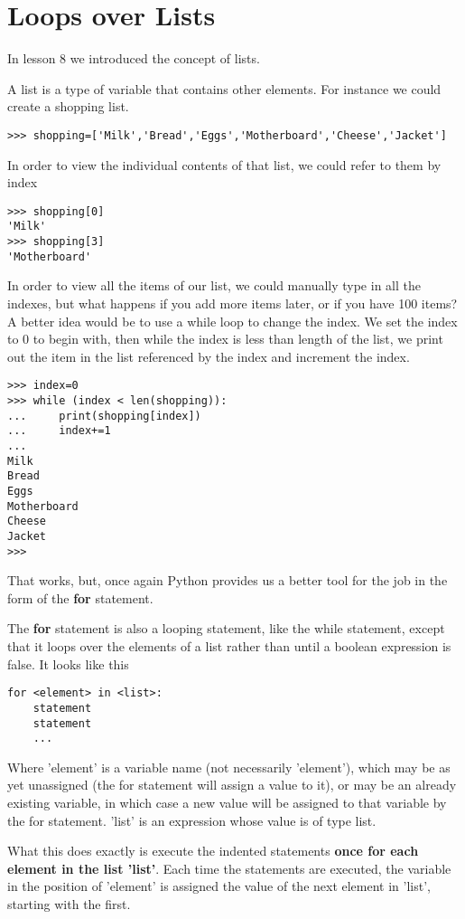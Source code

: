 \section{Loops over Lists}
In lesson 8 we introduced the concept of lists. 

A list is a type of variable that contains other elements. For instance we could create a shopping list. 
\begin{lstlisting}
>>> shopping=['Milk','Bread','Eggs','Motherboard','Cheese','Jacket']
\end{lstlisting}

In order to view the individual contents of that list, we could refer to them by index
\begin{lstlisting}
>>> shopping[0]
'Milk'
>>> shopping[3]
'Motherboard'
\end{lstlisting}

 In order to view all the items of our list, we could manually type in all the indexes, but what happens if you add more items later, or if you have 100 items? A better idea would be to use a while loop to change the index. We set the index to 0 to begin with, then while the index is less than length of the list, we print out the item in the list referenced by the index and increment the index.
\begin{lstlisting}
>>> index=0
>>> while (index < len(shopping)):
...     print(shopping[index])
...     index+=1
... 
Milk
Bread
Eggs
Motherboard
Cheese
Jacket
>>> 
\end{lstlisting}

That works, but, once again Python provides us a better tool for the job in the form of the \textbf{for} statement.

The \textbf{for} statement is also a looping statement, like the while statement, except that it loops   over the elements of a list rather than until a boolean expression is false. It looks like this
\begin{lstlisting}
for <element> in <list>:
    statement
    statement
    ...
\end{lstlisting}

Where 'element' is a variable name (not necessarily 'element'),   which may be as yet unassigned (the for statement will assign a value   to it), or may be an already existing variable, in which case a new value   will be assigned to that variable by the for statement. 'list' is an   expression whose value is of type list.

What this does exactly is execute the indented statements \textbf{once for each element in the list 'list'}. Each time the statements are executed, the variable in the position of 'element'   is assigned the value of the next element in 'list', starting with the   first.

